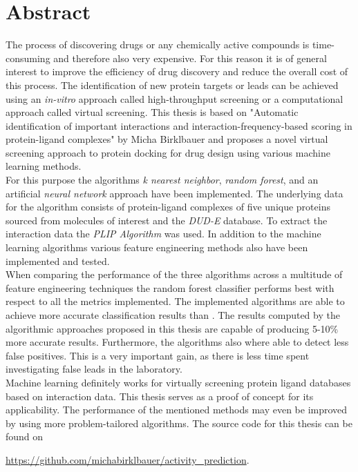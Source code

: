 \chapter{Abstract}

The process of discovering drugs or any chemically active compounds is time-consuming and therefore also very expensive.
For this reason it is of general interest to improve the efficiency of drug discovery and reduce the overall cost of this process.
The identification of new protein targets or leads can be achieved using an \textit{in-vitro} approach called high-throughput screening or a computational 
approach called virtual screening. 
This thesis is based on "Automatic identification of important interactions and interaction-frequency-based scoring in protein-ligand complexes" by Micha Birklbauer\cite[]{Birklbauer2021} and
proposes a novel virtual screening approach to protein docking for drug design using various machine learning methods.
\\
For this purpose the algorithms \textit{k nearest neighbor}, \textit{random forest}, and an artificial \textit{neural network} approach have been implemented.
The underlying data for the algorithm consists of protein-ligand complexes of five unique proteins sourced from molecules of interest and the \textit{DUD-E} database\cite[]{Mysinger2012}.
To extract the interaction data the \textit{PLIP Algorithm}\cite[]{Salentin2015} was used.
In addition to the machine learning algorithms various feature engineering methods also have been implemented and tested.
\\
When comparing the performance of the three algorithms across a multitude of feature engineering techniques the random forest classifier performs 
best with respect to all the metrics implemented.
The implemented algorithms are able to achieve more accurate classification results than \cite[]{Birklbauer2021}. The results computed by the algorithmic approaches proposed in this thesis
are capable of producing 5-10\% more accurate results. Furthermore, the algorithms also where able to detect less false positives. This is a very important gain, as there is less time spent 
investigating false leads in the laboratory.
\\
Machine learning definitely works for virtually screening protein ligand databases based on interaction data. This thesis serves as a proof of concept for its applicability.
The performance of the mentioned methods may even be improved by using more problem-tailored algorithms. 
The source code for this thesis can be found on

\href{https://github.com/michabirklbauer/activity_prediction}{https://github.com/michabirklbauer/activity\_prediction}. 
